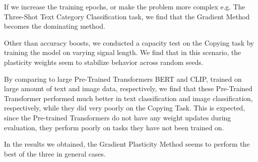 \documentclass{article}
\begin{document}
If we increase the training epochs, or make the problem more complex e.g. The Three-Shot Text Category Classification task, we find that the Gradient Method becomes the dominating method.

Other than accuracy boosts, we conducted a capacity test on the Copying task by training the model on varying signal length. We find that in this scenario, the plasticity weights seem to stabilize behavior across random seeds.

By comparing to large Pre-Trained Transformers BERT and CLIP, trained on large amount of text and image data, respectively, we find that these Pre-Trained Transformer performed much better in text classification and image classification, respectively, while they did very poorly on the Copying Task. This is expected, since the Pre-trained Transformers do not have any weight updates during evaluation, they perform poorly on tasks they have not been trained on.

In the results we obtained, the Gradient Plasticity Method seems to perform the best of the three in general cases.



\newpage


\end{document}
